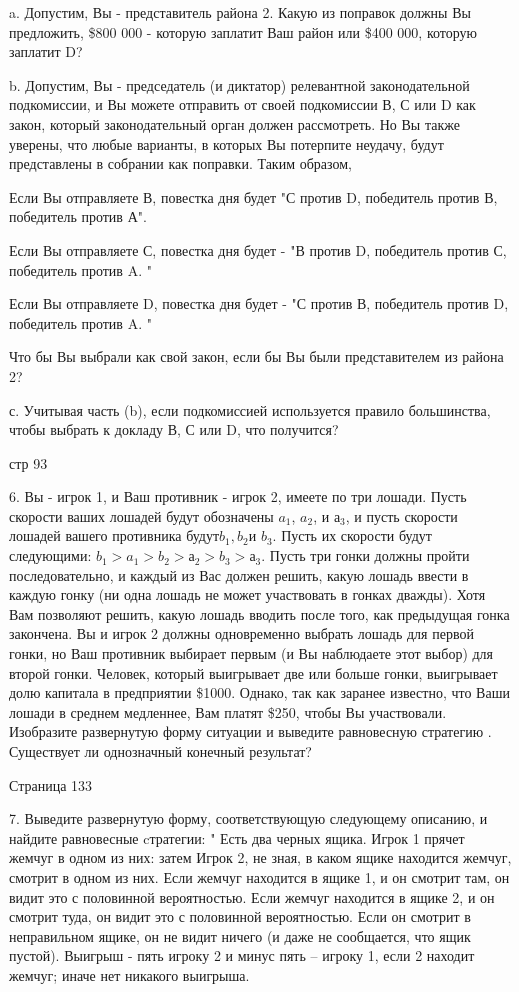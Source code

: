 \documentclass[a4paper,12pt]{article}
\begin{document}
a. Допустим, Вы - представитель района 2. Какую из
поправок должны Вы предложить, \$800 000 - которую
заплатит Ваш район или \$400 000, которую заплатит
D?

b. Допустим, Вы - председатель (и диктатор)
релевантной законодательной подкомиссии, и Вы
можете отправить от своей подкомиссии В, С или D
как закон, который законодательный орган должен
рассмотреть. Но Вы также уверены, что любые
варианты, в которых Вы потерпите неудачу, будут
представлены в собрании как поправки. Таким
образом,

Если Вы отправляете В, повестка дня будет "С против
D, победитель против В, победитель против А".

Если Вы отправляете С, повестка дня будет - "В
против D, победитель против С, победитель против A.
"

Если Вы отправляете D, повестка дня будет - "С
против В, победитель против D, победитель против A.
"

Что бы Вы выбрали как свой закон, если бы Вы были
представителем из района 2?

с. Учитывая часть (b), если подкомиссией
используется правило большинства, чтобы выбрать к
докладу В, С или D, что получится?

стр 93

6. Вы - игрок 1, и Ваш противник - игрок 2, имеете
по три лошади. Пусть скорости ваших лошадей будут
обозначены $a_{1}$, $a_{2}$, и $а _{3}$, и пусть
скорости лошадей вашего противника
будут$b_{1},b_{2}$и $b_{3}$. Пусть их скорости
будут следующими: $b_{1}>a_{1}>b_{2}>а _{2}>b_{3}>а
_{3}$. Пусть три гонки должны пройти
последовательно, и каждый из Вас должен решить,
какую лошадь ввести в каждую гонку (ни одна лошадь
не может участвовать в гонках дважды). Хотя Вам
позволяют решить, какую лошадь вводить после того,
как предыдущая гонка закончена. Вы и игрок 2 должны
одновременно выбрать лошадь для первой гонки, но
Ваш противник выбирает первым (и Вы наблюдаете этот
выбор) для второй гонки. Человек, который
выигрывает две или больше гонки, выигрывает долю
капитала в предприятии \$1000. Однако, так как
заранее известно, что Ваши лошади в среднем
медленнее, Вам платят \$250, чтобы Вы участвовали.
Изобразите развернутую форму ситуации и выведите
равновесную стратегию . Существует ли однозначный
конечный результат?

\bigskip

Страница 133

7. Выведите развернутую форму, соответствующую
следующему описанию, и найдите равновесные
cтратегии: " Есть два черных ящика. Игрок 1 прячет
жемчуг в одном из них: затем Игрок 2, не зная, в
каком ящике находится жемчуг, смотрит в одном из
них. Если жемчуг находится в ящике 1, и он смотрит
там, он видит это с половинной вероятностью. Если
жемчуг находится в ящике 2, и он смотрит туда, он
видит это с половинной вероятностью. Если он
смотрит в неправильном ящике, он не видит ничего (и
даже не сообщается, что ящик пустой). Выигрыш -
пять игроку 2 и минус пять -- игроку 1, если 2
находит жемчуг; иначе нет никакого выигрыша.
\end{document}
